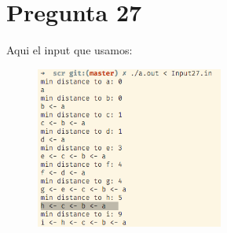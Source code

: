 \documentclass[12pt, fleqn]{article}                            %
\theoremstyle{break}                                            %
\begin{document}
    \clearpage
    \section{Pregunta 27}

        Aqui el input que usamos:
        

        \begin{figure}[h]
            \centering
            \includegraphics[width=0.55\textwidth]{Question27}
        \end{figure}




                
\end{document}
